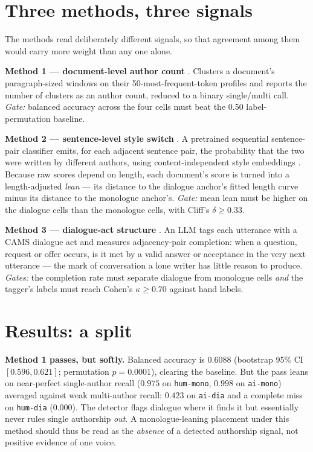 \documentclass[10pt,twocolumn]{article}
\begin{document}
\section{Three methods, three signals}
The methods read deliberately different signals, so that agreement among them would carry more
weight than any one alone.

\textbf{Method 1 --- document-level author count} \cite{nath2019}. Clusters a document's
paragraph-sized windows on their 50-most-frequent-token profiles and reports the number of
clusters as an author count, reduced to a binary single/multi call. \emph{Gate:} balanced accuracy
across the four cells must beat the 0.50 label-permutation baseline.

\textbf{Method 2 --- sentence-level style switch} \cite{schmidt2025}. A pretrained sequential
sentence-pair classifier emits, for each adjacent sentence pair, the probability that the two were
written by different authors, using content-independent style embeddings \cite{patel2025}. Because
raw scores depend on length, each document's score is turned into a length-adjusted \emph{lean}
--- its distance to the dialogue anchor's fitted length curve minus its distance to the monologue
anchor's. \emph{Gate:} mean lean must be higher on the dialogue cells than the monologue cells,
with Cliff's $\delta\ge0.33$.

\textbf{Method 3 --- dialogue-act structure} \cite{duran2022,schegloff1973}. An LLM tags each
utterance with a CAMS dialogue act and measures adjacency-pair completion: when a question,
request or offer occurs, is it met by a valid answer or acceptance in the very next utterance ---
the mark of conversation a lone writer has little reason to produce. \emph{Gates:} the completion
rate must separate dialogue from monologue cells \emph{and} the tagger's labels must reach
Cohen's $\kappa\ge0.70$ against hand labels.

\section{Results: a split}
\textbf{Method 1 passes, but softly.} Balanced accuracy is $0.6088$ (bootstrap 95\% CI
$[0.596,0.621]$; permutation $p=0.0001$), clearing the baseline. But the pass leans on
near-perfect single-author recall ($0.975$ on \texttt{hum-mono}, $0.998$ on \texttt{ai-mono})
averaged against weak multi-author recall: $0.423$ on \texttt{ai-dia} and a complete miss on
\texttt{hum-dia} ($0.000$). The detector flags dialogue where it finds it but essentially never
rules single authorship \emph{out}. A monologue-leaning placement under this method should thus be
read as the \emph{absence} of a detected authorship signal, not positive evidence of one voice.
\end{document}

